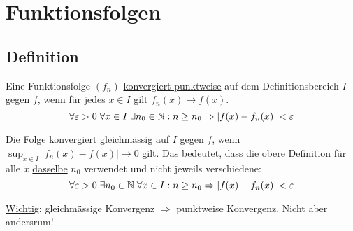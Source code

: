 \section{Funktionsfolgen}
\subsection{Definition}
Eine Funktionsfolge $(f_n)$ \underline{konvergiert punktweise} auf dem
Definitionsbereich $I$ gegen $f$, wenn für jedes $x \in I$ gilt $f_n(x) \to f(x)$.
\[
\forall \varepsilon > 0 \; \forall x \in I \; \exists n_0 \in \mathbb{N}: n \geq n_0
\Rightarrow |f(x) - f_n(x)| < \varepsilon
\]

Die Folge \underline{konvergiert gleichmässig} auf $I$ gegen $f$, wenn
$\sup_{x\in I} |f_n(x) - f(x)| \to 0$ gilt. Das bedeutet, dass die obere
Definition für alle $x$ \underline{dasselbe} $n_0$ verwendet und nicht jeweils
verschiedene:
\[
\forall \varepsilon > 0 \; \exists n_0 \in \mathbb{N} \; \forall x \in I: n \geq n_0
\Rightarrow |f(x) - f_n(x)| < \varepsilon
\]

\underline{Wichtig}: gleichmässige Konvergenz $\Rightarrow$ punktweise
Konvergenz. Nicht aber andersrum!
